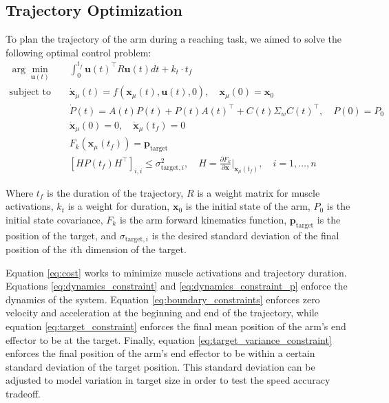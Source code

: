 \documentclass[table,12pt]{article}
\begin{document}
\subsection{Trajectory Optimization}
To plan the trajectory of the arm during a reaching task, we aimed to solve the following optimal control problem:
\begin{align}
    \arg\min_{\mathbf{u}(t)} &\quad \int_0^{t_f} \mathbf{u}(t)^\top R \mathbf{u}(t) dt + k_t \cdot t_f \label{eq:cost} \\
    \text{subject to} &\quad \dot{\mathbf{x}}_\mu(t) = f(\mathbf{x}_\mu(t), \mathbf{u}(t), 0), \quad \mathbf{x}_\mu(0) = \mathbf{x}_0 \label{eq:dynamics_constraint} \\
    &\quad \dot{P}(t) = A(t)P(t) + P(t)A(t)^\top + C(t) \Sigma_w C(t)^\top, \quad P(0) = P_0 \label{eq:dynamics_constraint_p} \\
    &\quad \dot{\mathbf{x}}_\mu(0) = 0, \quad \dot{\mathbf{x}}_\mu(t_f) = 0 \label{eq:boundary_constraints} \\
    &\quad F_k(\mathbf{x}_\mu(t_f)) = \mathbf{p}_{\text{target}} \label{eq:target_constraint} \\
    &\quad [HP(t_f)H^\top]_{i,i} \leq \sigma_{\text{target}, i}^2, \quad H = \frac{\partial F_k}{\partial \mathbf{x}}\bigg|_{\mathbf{x}_\mu(t_f)}, \quad i = 1, \ldots, n \label{eq:target_variance_constraint}
\end{align}

Where $t_f$ is the duration of the trajectory, $R$ is a weight matrix for muscle activations, $k_t$ is a weight for duration, $\mathbf{x}_0$ is the initial state of the arm, $P_0$ is the initial state covariance, $F_k$ is the arm forward kinematics function, $\mathbf{p}_{\text{target}}$ is the position of the target, and $\sigma_{\text{target}, i}$ is the desired standard deviation of the final position of the $i$th dimension of the target.

Equation \ref{eq:cost} works to minimize muscle activations and trajectory duration. Equations \ref{eq:dynamics_constraint} and \ref{eq:dynamics_constraint_p} enforce the dynamics of the system. Equation \ref{eq:boundary_constraints} enforces zero velocity and acceleration at the beginning and end of the trajectory, while equation \ref{eq:target_constraint} enforces the final mean position of the arm's end effector to be at the target. Finally, equation \ref{eq:target_variance_constraint} enforces the final position of the arm's end effector to be within a certain standard deviation of the target position. This standard deviation can be adjusted to model variation in target size in order to test the speed accuracy tradeoff.
\end{document}
